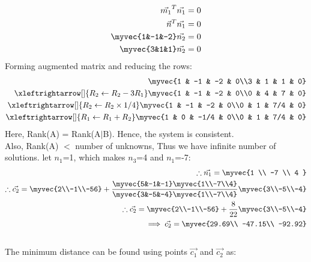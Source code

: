 \documentclass[journal,12pt,twocolumn]{IEEEtran}
\begin{document}
\\
\begin{align}
    \vec{m_1}^T\vec{n_1} =  0\\
    \vec{n}^T\vec{n_1} =  0\\
    \myvec{1&-1&-2}\vec{n_2}=0\\
    \myvec{3&1&1}\vec{n_2}=0
\end{align}
Forming augmented matrix and reducing the rows:
\begin{align}
\myvec{1 & -1 & -2 & 0\\3 & 1 & 1 & 0}\\
\xleftrightarrow[]{R_2\leftarrow R_2-3R_1}
\myvec{1 & -1 & -2 & 0\\0 & 4 & 7 & 0}\\
\xleftrightarrow[]{R_2\leftarrow R_2\times1/4}
\myvec{1 & -1 & -2 & 0\\0 & 1 & 7/4 & 0}\\
\xleftrightarrow[]{R_1\leftarrow R_1+R_2}
\myvec{1 & 0 & -1/4 & 0\\0 & 1 & 7/4 & 0}
\end{align} 
Here, Rank(A) = Rank(A$\mid$B). Hence, the system is consistent. 
\\
Also, Rank(A) $<$ number of unknowns, Thus we have infinite number of solutions. let $n_1$=1, which makes $n_3$=4 and $n_1$=-7:
\begin{align}
\therefore \vec{n_1}=\myvec{1 \\ -7 \\ 4 }\\
\therefore \vec{c_2}= \myvec{2\\-1\\-56}+\frac{\myvec{5&-1&-1} \myvec{1\\-7\\4}}{\myvec{3&-5&-4} \myvec{1\\-7\\4}}\myvec{3\\-5\\-4}\\
\therefore \vec{c_2}= \myvec{2\\-1\\-56}+\frac{8}{22}\myvec{3\\-5\\-4}\\
\implies \vec{c_2}=\myvec{29.69\\ -47.15\\ -92.92}
\end{align}
\\
The minimum distance can be found using points $\vec{c_1}$ and $\vec{c_2}$ as:
\end{document}
